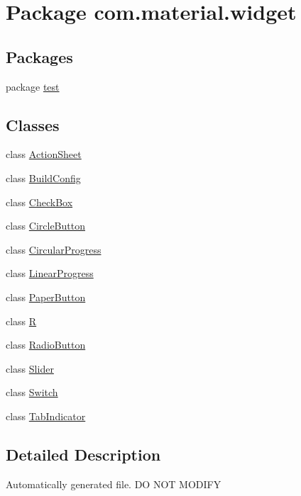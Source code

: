 \hypertarget{namespacecom_1_1material_1_1widget}{}\section{Package com.\+material.\+widget}
\label{namespacecom_1_1material_1_1widget}
\subsection*{Packages}
\begin{DoxyCompactItemize}
\item 
package \hyperlink{namespacecom_1_1material_1_1widget_1_1test}{test}
\end{DoxyCompactItemize}
\subsection*{Classes}
\begin{DoxyCompactItemize}
\item 
class \hyperlink{classcom_1_1material_1_1widget_1_1_action_sheet}{Action\+Sheet}
\item 
class \hyperlink{classcom_1_1material_1_1widget_1_1_build_config}{Build\+Config}
\item 
class \hyperlink{classcom_1_1material_1_1widget_1_1_check_box}{Check\+Box}
\item 
class \hyperlink{classcom_1_1material_1_1widget_1_1_circle_button}{Circle\+Button}
\item 
class \hyperlink{classcom_1_1material_1_1widget_1_1_circular_progress}{Circular\+Progress}
\item 
class \hyperlink{classcom_1_1material_1_1widget_1_1_linear_progress}{Linear\+Progress}
\item 
class \hyperlink{classcom_1_1material_1_1widget_1_1_paper_button}{Paper\+Button}
\item 
class \hyperlink{classcom_1_1material_1_1widget_1_1_r}{R}
\item 
class \hyperlink{classcom_1_1material_1_1widget_1_1_radio_button}{Radio\+Button}
\item 
class \hyperlink{classcom_1_1material_1_1widget_1_1_slider}{Slider}
\item 
class \hyperlink{classcom_1_1material_1_1widget_1_1_switch}{Switch}
\item 
class \hyperlink{classcom_1_1material_1_1widget_1_1_tab_indicator}{Tab\+Indicator}
\end{DoxyCompactItemize}


\subsection{Detailed Description}
Automatically generated file. DO N\+OT M\+O\+D\+I\+FY 
